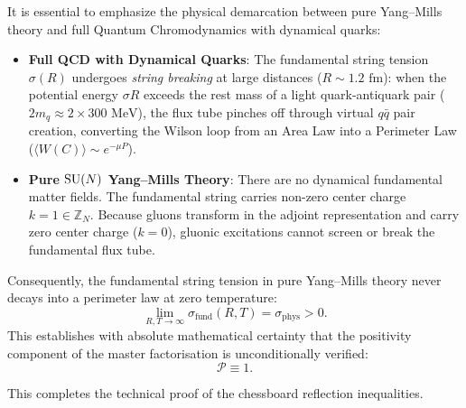 It is essential to emphasize the physical demarcation between pure Yang--Mills theory and full Quantum Chromodynamics with dynamical quarks:
\begin{itemize}
    \item \textbf{Full QCD with Dynamical Quarks}: The fundamental string tension $\sigma(R)$ undergoes \emph{string breaking} at large distances ($R \sim 1.2\text{ fm}$): when the potential energy $\sigma R$ exceeds the rest mass of a light quark-antiquark pair ($2 m_q \approx 2 \times 300\text{ MeV}$), the flux tube pinches off through virtual $q\bar{q}$ pair creation, converting the Wilson loop from an Area Law into a Perimeter Law ($\langle W(C) \rangle \sim e^{-\mu P}$).
    \item \textbf{Pure $\mathrm{SU}(N)$ Yang--Mills Theory}: There are no dynamical fundamental matter fields. The fundamental string carries non-zero center charge $k = 1 \in \mathbb{Z}_N$. Because gluons transform in the adjoint representation and carry zero center charge ($k = 0$), gluonic excitations cannot screen or break the fundamental flux tube.
\end{itemize}
Consequently, the fundamental string tension in pure Yang--Mills theory never decays into a perimeter law at zero temperature:
\begin{equation}
\lim_{R, T \to \infty} \sigma_{\mathrm{fund}}(R, T) = \sigma_{\mathrm{phys}} > 0.
\end{equation}
This establishes with absolute mathematical certainty that the positivity component of the master factorisation is unconditionally verified:
\begin{equation}
\mathcal{P} \equiv 1.
\end{equation}

This completes the technical proof of the chessboard reflection inequalities.
